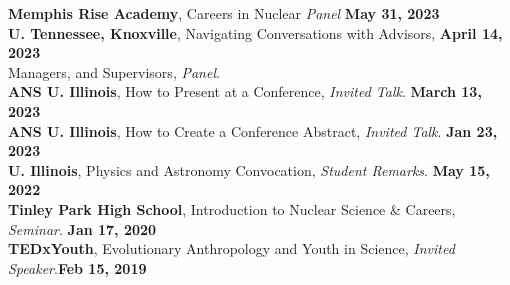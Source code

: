 \documentclass[margin,line]{resume}
\begin{document}
\begin{resume}
    \textbf{Memphis Rise Academy}, Careers in Nuclear \emph{Panel} \hfill\textbf{May 31, 2023}\\
    \textbf{U. Tennessee, Knoxville}, Navigating Conversations with Advisors,  \hfill\textbf{April 14, 2023}\\
    Managers, and Supervisors, \emph{Panel}.\\
    \textbf{ANS U. Illinois}, How to Present at a Conference, \emph{Invited Talk}.  \hfill\textbf{March 13, 2023}\\
    \textbf{ANS U. Illinois}, How to Create a Conference Abstract, \emph{Invited Talk}.  \hfill\textbf{Jan 23, 2023}\\
    \textbf{U. Illinois}, Physics and Astronomy Convocation, \emph{Student Remarks}.  \hfill\textbf{May 15, 2022}\\
    \textbf{Tinley Park High School}, Introduction to Nuclear Science \& Careers, \emph{Seminar}.  \hfill\textbf{Jan 17, 2020}\\
    \textbf{TEDxYouth}, Evolutionary Anthropology and Youth in Science, \emph{Invited Speaker}.\hfill\textbf{Feb 15, 2019}\\



\end{resume}
\end{document}
